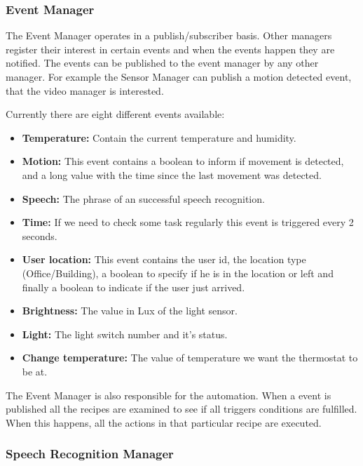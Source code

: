 \subsubsection{Event Manager}

The Event Manager  operates in a publish/subscriber basis. Other managers register their interest in certain events and when the events happen they are notified. The events can be published to the event manager by any other manager. For example the Sensor Manager can publish a motion detected event, that the video manager is interested.

Currently there are eight different events available:

\begin{itemize}
  \item \textbf{Temperature:} Contain the current temperature and humidity.
  \item \textbf{Motion:} This event contains a boolean to inform if movement is detected, and a long value with the time since the last movement was detected.
  \item \textbf{Speech:} The phrase of an successful speech recognition.  
  \item \textbf{Time:} If we need to check some task regularly this event is triggered every 2 seconds.  
  \item \textbf{User location:} This event contains the user id, the location type (Office/Building), a boolean to specify if he is in the location or left and finally a boolean to indicate if the user just arrived.
  \item \textbf{Brightness:} The value in Lux of the light sensor.  
  \item \textbf{Light:} The light switch number and it's status. 
  \item \textbf{Change temperature:} The value of temperature we want the thermostat to be at. 
  
\end{itemize}


The Event Manager is also responsible for the automation. When a event is published all the recipes are examined to see if all triggers conditions are fulfilled. When this happens, all the actions in that particular recipe are executed.


\subsubsection{Speech Recognition Manager}

